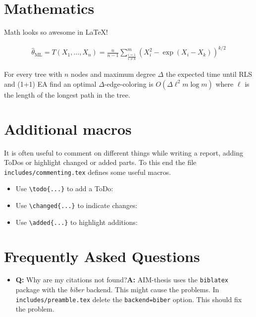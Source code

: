 \section{Mathematics}
Math looks so awesome in \LaTeX{}!

\begin{align*}
  \hat{\theta}_{\text{ML}} = T(X_1, \ldots, X_n) = \frac{n}{n-1} \sum_{\frac{i=1}{i \neq k}}^{m} \left(X_i^2 - \exp(X_i - X_k)\right)^{k/2}
\end{align*}

For every tree with $n$ nodes and maximum degree $\Delta$ the expected time until RLS and (1+1) EA find an optimal $\Delta$-edge-coloring is $O(\Delta \ell^2 m \log m)$ where $\ell$ is the length of the longest path in the tree.


\section{Additional macros}

It is often useful to comment on different things while writing a report, adding ToDos or highlight changed or added parts. To this end the file \texttt{includes/commenting.tex} defines some useful macros.
\begin{itemize}
    \item Use \verb|\todo{...}| to add a ToDo:\newline {}
    \item Use \verb|\changed{...}| to indicate changes:\newline {}
    \item Use \verb|\added{...}| to highlight additions:\newline {}
\end{itemize}

\section{Frequently Asked Questions}

\begin{itemize}
  \item \textbf{Q:} Why are my citations not found?\newline{}\textbf{A:} AIM-thesis uses the \texttt{biblatex} package with the \emph{biber} backend. This might cause the problems. In \texttt{includes/preamble.tex} delete the \texttt{backend=biber} option. This should fix the problem.
\end{itemize}
